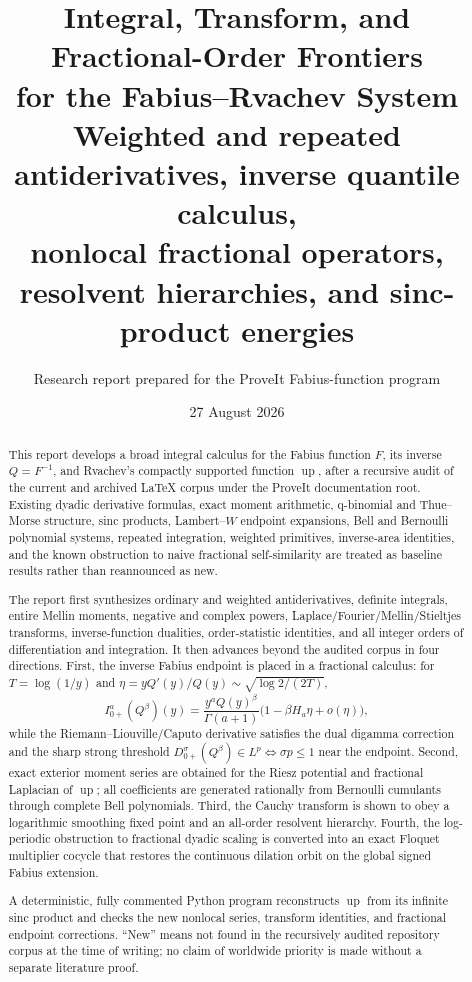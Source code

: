 \documentclass[11pt,oneside]{article}
\title{\bfseries Integral, Transform, and Fractional-Order Frontiers\\[2mm]
for the Fabius--Rvachev System\\[1mm]
\large Weighted and repeated antiderivatives, inverse quantile calculus,\\
nonlocal fractional operators, resolvent hierarchies, and sinc-product energies}
\author{Research report prepared for the ProveIt Fabius-function program}
\date{27 August 2026}
\theoremstyle{definition}
\newcommand{\F}{F}
\newcommand{\Q}{Q}
\newcommand{\upf}{\operatorname{up}}
\begin{document}
\maketitle

\begin{abstract}
This report develops a broad integral calculus for the Fabius function \(\F\), its
inverse \(\Q=\F^{-1}\), and Rvachev's compactly supported function \(\upf\), after a
recursive audit of the current and archived LaTeX corpus under the ProveIt documentation
root.  Existing dyadic derivative formulas, exact moment arithmetic, q-binomial and
Thue--Morse structure, sinc products, Lambert--\(W\) endpoint expansions, Bell and
Bernoulli polynomial systems, repeated integration, weighted primitives, inverse-area
identities, and the known obstruction to naive fractional self-similarity are treated as
baseline results rather than reannounced as new.

The report first synthesizes ordinary and weighted antiderivatives, definite integrals,
entire Mellin moments, negative and complex powers, Laplace/Fourier/Mellin/Stieltjes
transforms, inverse-function dualities, order-statistic identities, and all integer
orders of differentiation and integration.  It then advances beyond the audited corpus
in four directions.  First, the inverse Fabius endpoint is placed in a fractional
calculus: for \(T=\log(1/y)\) and
\(\eta=y\Q'(y)/\Q(y)\sim\sqrt{\log2/(2T)}\),
\[
 I_{0+}^{a}(\Q^\beta)(y)
 =\frac{y^a\Q(y)^\beta}{\Gamma(a+1)}
  \bigl(1-\beta H_a\eta+o(\eta)\bigr),
\]
while the Riemann--Liouville/Caputo derivative satisfies the dual digamma correction and
the sharp strong threshold
\(D_{0+}^{\sigma}(\Q^\beta)\in L^p\iff \sigma p\le1\) near the endpoint.  Second,
exact exterior moment series are obtained for the Riesz potential and fractional
Laplacian of \(\upf\); all coefficients are generated rationally from Bernoulli
cumulants through complete Bell polynomials.  Third, the Cauchy transform is shown to
obey a logarithmic smoothing fixed point and an all-order resolvent hierarchy.  Fourth,
the log-periodic obstruction to fractional dyadic scaling is converted into an exact
Floquet multiplier cocycle that restores the continuous dilation orbit on the global
signed Fabius extension.

A deterministic, fully commented Python program reconstructs \(\upf\) from its infinite
sinc product and checks the new nonlocal series, transform identities, and fractional
endpoint corrections.  ``New'' means not found in the recursively audited repository
corpus at the time of writing; no claim of worldwide priority is made without a separate
literature proof.
\end{abstract}
\end{document}
